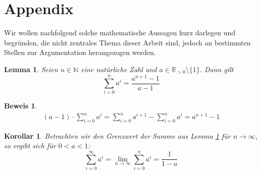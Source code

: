 \documentclass[a4paper]{article}
\newtheorem{korollar}[satz]{Korollar}
\newtheorem{lemma}[satz]{Lemma}
\theoremstyle{nonumberplain}
\newtheorem{beweis}{Beweis}
\begin{document}
\begin{comment}
	\addplot[ only marks,color=blue,mark=square,name path=f]
	coordinates {
	(33,0.2166)(95,0.4558)(210,0.8892)(397,1.5893)(674,2.6494)(1570,6.4088)(76,0.4086)(354,1.6069)(1067,4.5743)(2557,11.1483)(5257,27.398)(16495,81.2725)(172,0.8519)(1292,6.237)(5267,25.332)(15833,76.5412)(39158,194.1443)(164288,879.2178)(398,1.9171)(4487,22.1102)(24979,130.9343)(94408,510.1477)(280865,1570.9472)
	};
	
	\addplot[only marks,color=red,mark=triangle,name path=f]
	coordinates {
	(28,0.0228)(244,0.2634)(2188,1.3599)(19684,14.4951)(177148,173.7169)(1594324,2145.145)(14348908,35305.0664)
	};
	
	\addlegendentry{leader\_sync}
	\addlegendentry{herman}
	\end{axis}
	\end{tikzpicture}
	\end{figure}
	\end{comment}
	\section{Appendix}
	
	Wir wollen nachfolgend solche mathematische Aussagen kurz darlegen und begründen, die nicht zentrales Thema dieser Arbeit sind, jedoch an bestimmten Stellen zur Argumentation herangezogen werden.
	
	\begin{lemma} \label{lem-geosum}
		Seien $n \in \mathbb{N}$ eine natürliche Zahl und $a \in \mathbb{R}_{>0}\setminus\{1\}$. Dann gilt
		\begin{equation}
		\sum_{i=0}^{n}{a^i} = \frac{a^{n+1}-1}{a-1}
		\end{equation}
	\end{lemma}
	\begin{beweis}
		\begin{align*}
		(a-1) \cdot \sum_{i=0}^{n}{a^i} = \sum_{i=0}^{n}{a^{i+1}} - \sum_{i=0}^{n}{a^i} = a^{n+1} - 1
		\end{align*}
	\end{beweis}
	
	\begin{korollar} \label{kor-geosum}
		Betrachten wir den Grenzwert der Summe aus Lemma \ref{lem-geosum} für $n \to \infty$, so ergibt sich für $0<a<1$:
		\begin{equation}
		\sum_{i=0}^{\infty}{a^i}
		= \lim\limits_{n \to \infty} \sum_{i=0}^{n}{a^i}
		= \frac{1}{1-a}
		\end{equation}
	\end{korollar}
	
\end{document}
